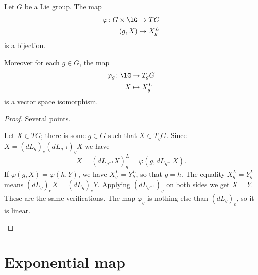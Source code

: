 \begin{proposition}
    Let \( G\) be a Lie group. The map
    \begin{equation}
        \begin{aligned}
            \varphi\colon G\times \lG&\to TG \\
            (g,X)&\mapsto X^L_g 
        \end{aligned}
    \end{equation}
    is a bijection.

    Moreover for each \( g\in G\), the map
    \begin{equation}
        \begin{aligned}
            \varphi_g\colon \lG&\to T_gG \\
           X&\mapsto X^L_g 
        \end{aligned}
    \end{equation}
    is a vector space isomorphism.
\end{proposition}

\begin{proof}
    Several points.
    \begin{subproof}
            Let \( X\in TG\); there is some \( g\in G\) such that \( X\in T_gG\). Since \( X=(dL_g)_e(dL_{g^{-1}})_gX\) we have
            \begin{equation}
                X=(dL_{g^{-1}}X)^L_g=\varphi(g,dL_{g^{-1}}X).
            \end{equation}
            If \( \varphi(g,X)=\varphi(h,Y)\), we have \( X_g^L=Y^L_h\), so that \( g=h\). The equality  \( X_g^L=Y_g^L\) means \( (dL_g)_eX=(dL_g)_eY\). Applying \( (dL_{g^{-1}})_g\) on both sides we get \( X=Y\).
            These are the same verifications.
            The map \( \varphi_g\) is nothing else than \( (dL_g)_e\), so it is linear.
    \end{subproof}
\end{proof}

\section{Exponential map}

